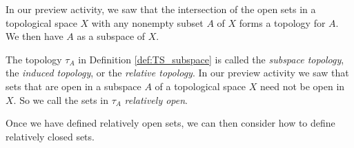\begin{comment}
	\item  Recall that the nonempty open sets in $\Z$ are those sets whose complements are finite. Note that the $\Z \setminus \{5\}$ is in $\tau_{FC}$. So if $n \in A$, then $(\Z \setminus \{5\}) \cap \{n\} = \{n\}$. So every subset of $A$ is open and $\tau_{A}$ is the discrete topology. The same argument shows that if $A$ is any finite subset of $\Z$, then the induced topology is the discrete topology. 

\item  Let $\E$ be the set of even integers. We claim that the induced topology is again the finite complement topology. Let $U$ be a subset of $\E$ with $\E \setminus U$ a finite subset of $\E$. Let $O$ be the union of $U$ with the set of odd integers. That is, $O = U \cup (\Z \setminus \E)$. Then $\Z \setminus O = \E \setminus U$ is finite and $O$ is in $\tau_{FC}$. Since $U = \E \cap O$, we have that $U$ is in the subspace topology. Conversely, if $O \in \tau_{FC}$, then $\Z \setminus O$ is finite. Since $\E \subset \Z$, we have $(\E \setminus O) \subseteq (\Z \setminus O)$ and 
\[\E \setminus (\E \cap O) = \E \setminus O\]
 is a finite set. So the only elements in the subspace topology are those whose complements in $\E$ are finite.  
 
 The same argument will show that if $X$ is an infinite topological space with the finite complement topology, then the induced topology on any infinite subset is the finite complement topology. 

\ea

\ee

\end{comment}

\label{sec_subspace_top}

In our preview activity, we saw that the intersection of the open sets in a topological space $X$ with any nonempty subset $A$ of $X$ forms a topology for $A$. We then have $A$ as a subspace of $X$.  

The topology $\tau_A$ in Definition \ref{def:TS_subspace} is called the \emph{subspace topology}, the \emph{induced topology}, or the \emph{relative topology}. In our preview activity we saw that sets that are open in a subspace $A$ of a topological space $X$ need not be open in $X$. So we call the sets in $\tau_A$ \emph{relatively open}.  

Once we have defined relatively open sets, we can then consider how to define relatively closed sets. 

